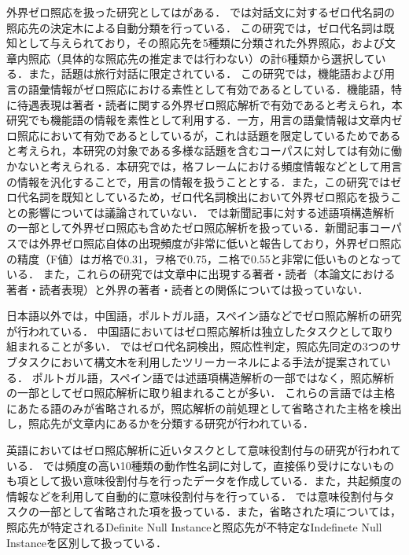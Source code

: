 \documentclass[japanese]{jnlp_1.4}
\begin{document}
外界ゼロ照応を扱った研究としては\cite{山本和英:1999,平2013}がある．
\cite{山本和英:1999}では対話文に対するゼロ代名詞の照応先の決定木による自動分類を行っている．
この研究では，ゼロ代名詞は既知として与えられており，その照応先を5種類に分類された外界照応，および文章内照応（具体的な照応先の推定までは行わない）の計6種類から選択している．また，話題は旅行対話に限定されている．
この研究では，機能語および用言の語彙情報がゼロ照応における素性として有効であるとしている．機能語，特に待遇表現は著者・読者に関する外界ゼロ照応解析で有効であると考えられ，本研究でも機能語の情報を素性として利用する．一方，用言の語彙情報は文章内ゼロ照応において有効であるとしているが，これは話題を限定しているためであると考えられ，本研究の対象である多様な話題を含むコーパスに対しては有効に働かないと考えられる．本研究では，格フレームにおける頻度情報などとして用言の情報を汎化することで，用言の情報を扱うこととする．また，この研究ではゼロ代名詞を既知としているため，ゼロ代名詞検出において外界ゼロ照応を扱うことの影響については議論されていない．
\cite{平2013}では新聞記事に対する述語項構造解析の一部として外界ゼロ照応も含めたゼロ照応解析を扱っている．新聞記事コーパスでは外界ゼロ照応自体の出現頻度が非常に低いと報告しており，外界ゼロ照応の精度（F値）はガ格で0.31，ヲ格で0.75，ニ格で0.55と非常に低いものとなっている．
また，これらの研究では文章中に出現する著者・読者（本論文における著者・読者表現）と外界の著者・読者との関係については扱っていない．

日本語以外では，中国語，ポルトガル語，スペイン語などでゼロ照応解析の研究が行われている．
中国語においてはゼロ照応解析は独立したタスクとして取り組まれることが多い．
\cite{kong-zhou:2010:EMNLP}ではゼロ代名詞検出，照応性判定，照応先同定の3つのサブタスクにおいて構文木を利用したツリーカーネルによる手法が提案されている．
ポルトガル語，スペイン語では述語項構造解析の一部ではなく，照応解析の一部としてゼロ照応解析に取り組まれることが多い．
これらの言語では主格にあたる語のみが省略されるが，照応解析の前処理として省略された主格を検出し，照応先が文章内にあるかを分類する研究が行われている\cite{poesio2010creating,rello2012elliphant}．


英語においてはゼロ照応解析に近いタスクとして意味役割付与の研究が行われている\cite{gerber-chai:2010:ACL,ruppenhofer-EtAl:2010:SemEval}．
\cite{gerber-chai:2010:ACL}では頻度の高い10種類の動作性名詞に対して，直接係り受けにないものも項として扱い意味役割付与を行ったデータを作成している．また，共起頻度の情報などを利用して自動的に意味役割付与を行っている．
\cite{ruppenhofer-EtAl:2010:SemEval}では意味役割付与タスクの一部として省略された項を扱っている．また，省略された項については，照応先が特定されるDefinite Null Instanceと照応先が不特定なIndefinete Null Instanceを区別して扱っている．
\end{document}
